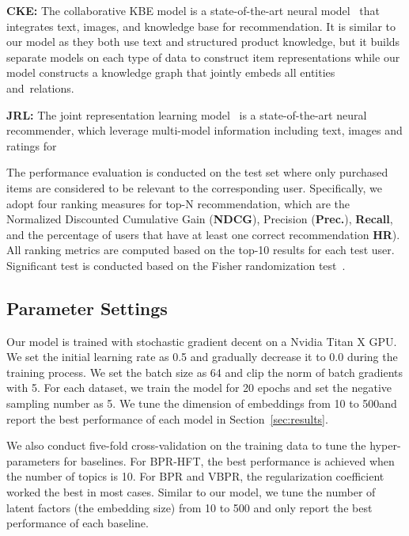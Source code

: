 \documentclass[algorithms,article,accept,moreauthors,pdftex,10pt,a4paper]{Definitions/mdpi}
\begin{document}
\textbf{CKE: } The collaborative KBE model is a state-of-the-art neural model~\cite{zhang2016collaborativekdd} that integrates text, images, and knowledge base for recommendation. It is similar to our model as they both use text and structured product knowledge, but it builds separate models on each type of data to construct item representations while our model constructs a knowledge graph that jointly embeds all entities and~relations. 

\textbf{JRL: } The joint representation learning model~\cite{zhang2017joint} is a state-of-the-art neural recommender, which leverage multi-model information including text, images and ratings for 

\vspace{6 pt} The performance evaluation is conducted on the test set where only purchased items are considered to be relevant to the corresponding user.
Specifically, we adopt four ranking measures for top-N recommendation, which are the Normalized Discounted Cumulative Gain (\textbf{NDCG}), Precision (\textbf{Prec.}), \textbf{Recall}, and the percentage of users that have at least one correct recommendation \textbf{HR}).
All ranking metrics are computed based on the top-10 results for each test user.
Significant test is conducted based on the Fisher randomization test~\cite{smucker2007comparison}.




\subsection{Parameter Settings}

Our model is trained with stochastic gradient decent on a Nvidia Titan X GPU.
We set the initial learning rate as 0.5 and gradually decrease it to 0.0 during the training process. 
We set the batch size as 64 and clip the norm of batch gradients with 5.
For each dataset, we train the model for 20 epochs and set the negative sampling number as 5.
We tune the dimension of embeddings from 10 to 500\linebreak{ ([10, 50, 100, 200, 300, 400, 500]) }and report the best performance of each model in Section~\ref{sec:results}.

We also conduct five-fold cross-validation on the training data to tune the hyper-parameters for baselines. 
For BPR-HFT, the best performance is achieved when the number of topics is 10.
For BPR and VBPR, the regularization coefficient  worked the best in most cases.
Similar to our model, we tune the number of latent factors (the embedding size) from 10 to 500 and only report the best performance of each baseline.
\end{document}
